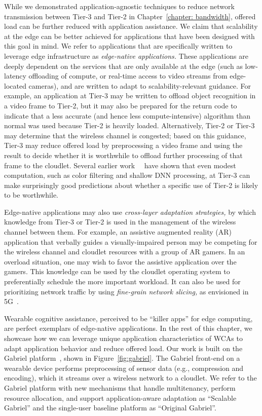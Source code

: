 While we demonstrated application-agnostic techniques to reduce network
transmission between Tier-3 and Tier-2 in Chapter~\ref{chapter: bandwidth},
offered load can be further reduced with application assistance. We claim that
scalability at the edge can be better achieved for applications that have been
designed with this goal in mind.  We refer to applications that are specifically
written to leverage edge infrastructure as {\em edge-native applications.} These
applications are deeply dependent on the services that are only available at the
edge (such as low-latency offloading of compute, or real-time access to video
streams from edge-located cameras), and are written to adapt to
scalability-relevant guidance.  For example, an application at Tier-3 may be
written to offload object recognition in a video frame to Tier-2, but it may
also be prepared for the return code to indicate that a less accurate (and hence
less compute-intensive) algorithm than normal was used because Tier-2 is heavily
loaded.  Alternatively, Tier-2 or Tier-3 may determine that the wireless channel
is congested; based on this guidance, Tier-3 may reduce offered load by
preprocessing a video frame and using the result to decide whether it is
worthwhile to offload further processing of that frame to the cloudlet.  Several
earlier work~\cite{Hu2015}~\cite{christensen2019towards} have shown that even
modest computation, such as color filtering and shallow DNN processing, at Tier-3
can make surprisingly good predictions about whether a specific use of Tier-2 is
likely to be worthwhile.

Edge-native applications may also use {\em cross-layer adaptation
  strategies,} by which knowledge from Tier-3 or Tier-2 is used in the
management of the wireless channel between them.  For example, an
assistive augmented reality (AR) application that verbally guides a
visually-impaired person may be competing for the wireless channel and
cloudlet resources with a group of AR gamers.  In an overload
situation, one may wish to favor the assistive application over the
gamers.  This knowledge can be used by the cloudlet operating system
to preferentially schedule the more important workload.  It can also
be used for prioritizing network traffic by using {\em fine-grain
  network slicing,} as envisioned in 5G~\cite{Contreras2018}.

Wearable cognitive assistance, perceived to be ``killer apps'' for edge
computing, are perfect exemplars of edge-native applications. In the rest of
this chapter, we showcase how we can leverage unique application characteristics
of WCAs to adapt application behavior and reduce offered load. Our work is built
on the Gabriel platform~\cite{ha2014towards,chen2017empirical}, shown in
Figure~\ref{fig:gabriel}. The Gabriel front-end on a wearable device performs
preprocessing of sensor data (e.g., compression and encoding), which it streams
over a wireless network to a cloudlet. We refer to the Gabriel platform with new
mechanisms that handle multitenancy, perform resource allocation, and support
application-aware adaptation as ``Scalable Gabriel'' and the single-user
baseline platform as ``Original Gabriel''.

